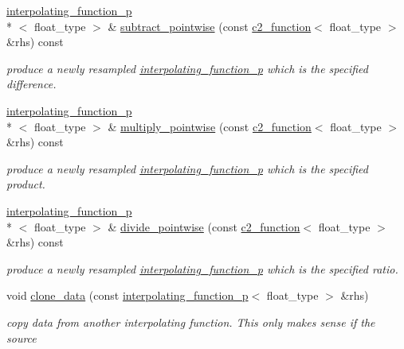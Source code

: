 \begin{DoxyCompactItemize}
\hyperlink{classinterpolating__function__p}{interpolating\-\_\-function\-\_\-p}\\*
$<$ float\-\_\-type $>$ \& \hyperlink{classinterpolating__function__p_aa27983f5383b557005bc49d21cc268fa}{subtract\-\_\-pointwise} (const \hyperlink{classc2__function}{c2\-\_\-function}$<$ float\-\_\-type $>$ \&rhs) const 
\begin{DoxyCompactList}\small\item\em produce a newly resampled \hyperlink{classinterpolating__function__p}{interpolating\-\_\-function\-\_\-p} which is the specified difference. \end{DoxyCompactList}\item 
\hyperlink{classinterpolating__function__p}{interpolating\-\_\-function\-\_\-p}\\*
$<$ float\-\_\-type $>$ \& \hyperlink{classinterpolating__function__p_a5640f0ebe0ac71481ccb4d8fd1405c72}{multiply\-\_\-pointwise} (const \hyperlink{classc2__function}{c2\-\_\-function}$<$ float\-\_\-type $>$ \&rhs) const 
\begin{DoxyCompactList}\small\item\em produce a newly resampled \hyperlink{classinterpolating__function__p}{interpolating\-\_\-function\-\_\-p} which is the specified product. \end{DoxyCompactList}\item 
\hyperlink{classinterpolating__function__p}{interpolating\-\_\-function\-\_\-p}\\*
$<$ float\-\_\-type $>$ \& \hyperlink{classinterpolating__function__p_aaf55fce715316d9e25415d1ad9432385}{divide\-\_\-pointwise} (const \hyperlink{classc2__function}{c2\-\_\-function}$<$ float\-\_\-type $>$ \&rhs) const 
\begin{DoxyCompactList}\small\item\em produce a newly resampled \hyperlink{classinterpolating__function__p}{interpolating\-\_\-function\-\_\-p} which is the specified ratio. \end{DoxyCompactList}\item 
void \hyperlink{classinterpolating__function__p_ab73a92cc7c402a1cf5a2653fef17f662}{clone\-\_\-data} (const \hyperlink{classinterpolating__function__p}{interpolating\-\_\-function\-\_\-p}$<$ float\-\_\-type $>$ \&rhs)
\begin{DoxyCompactList}\small\item\em copy data from another interpolating function. This only makes sense if the source \end{DoxyCompactList}\end{DoxyCompactItemize}
